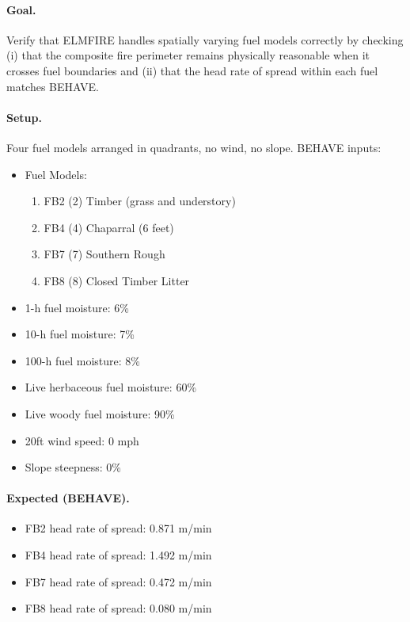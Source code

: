 \paragraph{Goal.} Verify that ELMFIRE handles spatially varying fuel models correctly by checking (i) that the composite fire perimeter remains physically reasonable when it crosses fuel boundaries and (ii) that the head rate of spread within each fuel matches BEHAVE.

\paragraph{Setup.} Four fuel models arranged in quadrants, no wind, no slope. BEHAVE inputs:

\begin{itemize}
    \item Fuel Models:
    \begin{enumerate}
        \item FB2 (2) Timber (grass and understory)
        \item FB4 (4) Chaparral (6 feet)
        \item FB7 (7) Southern Rough
        \item FB8 (8) Closed Timber Litter
    \end{enumerate}
    \item 1-h fuel moisture: 6\%
    \item 10-h fuel moisture: 7\%
    \item 100-h fuel moisture: 8\%
    \item Live herbaceous fuel moisture: 60\%
    \item Live woody fuel moisture: 90\%
    \item 20ft wind speed: 0 mph
    \item Slope steepness: 0\%
\end{itemize}

\paragraph{Expected (BEHAVE).}
\begin{itemize}
    \item FB2 head rate of spread: 0.871 m/min
    \item FB4 head rate of spread: 1.492 m/min
    \item FB7 head rate of spread: 0.472 m/min
    \item FB8 head rate of spread: 0.080 m/min
\end{itemize}

